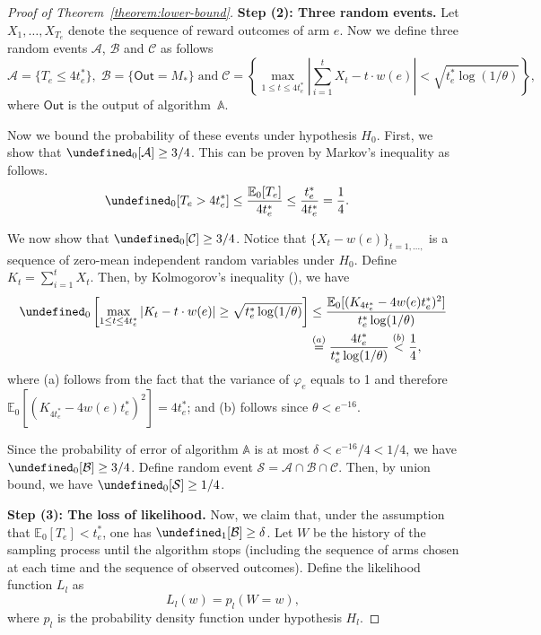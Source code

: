 \documentclass{article}
\newcommand{\Rew}{\varphi}
\newcommand{\E}{\mathbb E}
\newcommand{\out}{\mathsf{Out}}
\let\Pr\undefined
\DeclareMathOperator{\Pr}{Pr}
\begin{document}
\begin{proof}[Proof of Theorem~\ref{theorem:lower-bound}]
\textbf{Step (2): Three random events.}
Let $X_1,\ldots,X_{T_e}$ denote the sequence of reward outcomes of arm $e$.
Now we define three random events $\mathcal A$, $\mathcal B$ and $\mathcal C$ as follows
$$
\mathcal A = \{T_e \le 4t_e^* \},\;\mathcal B=\{\out=M_*\}\;\text{and}\;\mathcal C=\left\{\max_{1\le t \le 4t_e^*} \left|\sum_{i=1}^t X_t - t\cdot w(e)\right|  < \sqrt{t_e^*\log(1/\theta)} \right\},
$$
where $\out$ is the output of algorithm~$\mathbb A$.

Now we bound the probability of these events under hypothesis $H_0$.
First, we show that $\Pr_0[\mathcal A] \ge 3/4$. 
This can be proven by Markov's inequality as follows.
\begin{align*}
\Pr_0[T_e > 4t_e^*] &\le \frac{\E_0[T_e]}{4t_e^*} \le \frac{t_e^*}{4t_e^*} = \frac14.
\end{align*}

We now show that $\Pr_0[\mathcal C] \ge 3/4$.
Notice that $\big\{X_t-w(e)\big\}_{t=1,\ldots,}$ is a sequence of zero-mean independent random variables under $H_0$.
Define $K_t = \sum_{i=1}^t X_t$.
Then, by Kolmogorov's inequality (), we have
\begin{align*}
\Pr_0\left[\max_{1\le t \le 4t_e^*} \left|K_t-t\cdot w(e)\right| \ge \sqrt{t_e^*\log(1/\theta)} \right]
&\le \frac{\E_0[ (K_{4t_e^*}-4w(e)t_e^*)^2]}{t_e^*\log(1/\theta)}\\
&\stackrel{(a)}{=} \frac{4t_e^*}{t_e^*\log(1/\theta)} \stackrel{(b)}{<} \frac14,
\end{align*}
where (a) follows from the fact that the variance of $\Rew_e$ equals to 1 and therefore $\E_0[(K_{4t_e^*}-4w(e)t_e^*)^2] = 4t_e^*$; and (b) follows 
since $\theta < e^{-16}$.

Since the probability of error of algorithm $\mathbb A$ is at most $\delta <  e^{-16}/4 < 1/4$, we have $\Pr_0[\mathcal B] \ge 3/4$.
Define random event $\mathcal S=\mathcal A\cap \mathcal B \cap \mathcal C$. 
Then, by union bound, we have $\Pr_0[\mathcal S]\ge 1/4$.

\textbf{Step (3): The loss of likelihood.}
Now, we claim that, under the assumption that $\E_0[T_e] < t_e^*$, one has $\Pr_1[\mathcal B] \ge \delta$.
Let $W$ be the history of the sampling process until the algorithm stops (including the sequence of arms chosen at each time and the sequence of observed outcomes).
Define the likelihood function $L_l$ as 
$$
L_l(w) = p_l(W=w),
$$
where $p_l$ is the probability density function under hypothesis $H_l$.


\end{proof}
\end{document}
